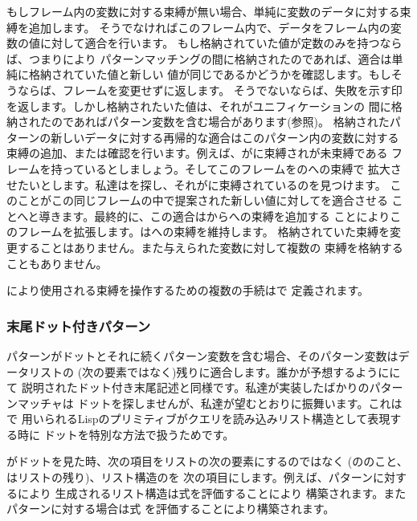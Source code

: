 \noindent
もしフレーム内の変数に対する束縛が無い場合、単純に変数のデータに対する束縛を追加します。
そうでなければこのフレーム内で、データをフレーム内の変数の値に対して適合を行います。
もし格納されていた値が定数のみを持つならば、つまりにより
パターンマッチングの間に格納されたのであれば、適合は単純に格納されていた値と新しい
値が同じであるかどうかを確認します。もしそうならば、フレームを変更せずに返します。
そうでないならば、失敗を示す印を返します。しかし格納されたいた値は、それがユニフィケーションの
間に格納されたのであればパターン変数を含む場合があります(参照)。
格納されたパターンの新しいデータに対する再帰的な適合はこのパターン内の変数に対する
束縛の追加、または確認を行います。例えば、がに束縛されが未束縛である
フレームを持っているとしましょう。そしてこのフレームをのへの束縛で
拡大させたいとします。私達はを探し、それがに束縛されているのを見つけます。
このことがこの同じフレームの中で提案された新しい値に対してを適合させる
ことへと導きます。最終的に、この適合はからへの束縛を追加する
ことによりこのフレームを拡張します。はへの束縛を維持します。
格納されていた束縛を変更することはありません。また与えられた変数に対して複数の
束縛を格納することもありません。


により使用される束縛を操作するための複数の手続はで
定義されます。

\subsubsection*{末尾ドット付きパターン}
\label{Sec. 4.4.4.4}
\label{Section 4.4.4.4}

パターンがドットとそれに続くパターン変数を含む場合、そのパターン変数はデータリストの
(次の要素ではなく)残りに適合します。誰かが予想するようににて
説明されたドット付き末尾記述と同様です。私達が実装したばかりのパターンマッチャは
ドットを探しませんが、私達が望むとおりに振舞います。これはで
用いられるLispのプリミティブがクエリを読み込みリスト構造として表現する時に
ドットを特別な方法で扱うためです。

がドットを見た時、次の項目をリストの次の要素にするのではなく
(ののこと、はリストの残り)、リスト構造のを
次の項目にします。例えば、パターンに対するにより
生成されるリスト構造は式を評価することにより
構築されます。またパターンに対する場合は式
を評価することにより構築されます。

